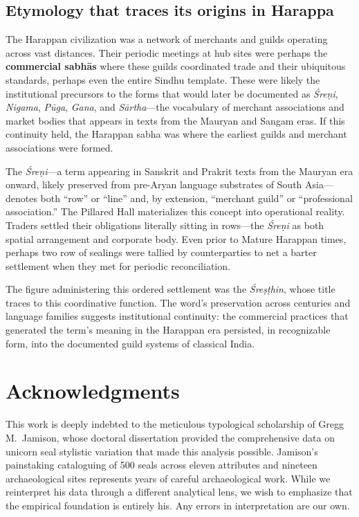 \documentclass[12pt]{article}
\begin{document}
\subsection{Etymology that traces its origins in Harappa}

The Harappan civilization was a network of merchants and guilds operating
across vast distances. Their periodic meetings at hub sites were perhaps the
\textbf{commercial sabh\={a}s} where these guilds coordinated trade and their
ubiquitous standards, perhaps even the entire Sindhu template. These were
likely the institutional precursors to the forms that would later be documented
as \textit{Śreṇi}, \textit{Nigama}, \textit{Pūga}, \textit{Gana}, and \textit{Sārtha}---the
vocabulary of merchant associations and market bodies that appears in texts from
the Mauryan and Sangam eras. If this continuity held, the Harappan sabha was where
the earliest guilds and merchant associations were formed.

The \textit{\'{S}re\d{n}i}---a term appearing in Sanskrit and Prakrit texts from the 
Mauryan era onward, likely preserved from pre-Aryan language substrates of South 
Asia---denotes both ``row'' or ``line'' and, by extension, ``merchant guild'' or 
``professional association.'' The Pillared Hall materializes this concept into 
operational reality. Traders settled their obligations literally sitting in 
rows---the \textit{\'{S}re\d{n}i} as both spatial arrangement and corporate body.
Even prior to Mature Harappan times, perhaps two row of sealings were tallied by
counterparties to net a barter settlement when they met for periodic reconciliation.

The figure administering this ordered settlement was the \textit{\'{S}re\d{s}\d{t}hin}, 
whose title traces to this coordinative function. The word's preservation across 
centuries and language families suggests institutional continuity: the commercial 
practices that generated the term's meaning in the Harappan era persisted, in 
recognizable form, into the documented guild systems of classical India.

\section*{Acknowledgments}

This work is deeply indebted to the meticulous typological scholarship of
Gregg M.~Jamison, whose doctoral dissertation \citep{jamison2017} provided the
comprehensive data on unicorn seal stylistic variation that made this analysis
possible. Jamison's painstaking cataloguing of 500 seals across eleven attributes
and nineteen archaeological sites represents years of careful archaeological work.
While we reinterpret his data through a different analytical lens, we wish to
emphasize that the empirical foundation is entirely his. Any errors in
interpretation are our own.
\end{document}
